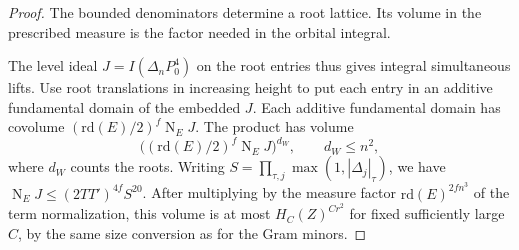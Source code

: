 \begin{proof}

The bounded denominators determine a root lattice. Its volume in the prescribed measure is the factor needed in the orbital integral.


The level ideal \(J=I(\Delta_nP_0^4)\) on the root
entries thus gives integral simultaneous lifts.
Use root translations in increasing height to put
each entry in an additive fundamental domain of
the embedded \(J\). Each additive fundamental domain has covolume
\((\mathrm{rd}(E)/2)^f\operatorname N_EJ\). The product has volume
\[
       \big((\mathrm{rd}(E)/2)^f\operatorname N_EJ\big)^{d_W},
       \qquad d_W\le n^2 ,
\]
where \(d_W\) counts the roots.
Writing \(S=\prod_{\tau,j}\max(1,|\Delta_j|_\tau)\),
we have \(\operatorname N_EJ\leq(2TT')^{4f}S^{20}\).
After multiplying by the measure factor
\(\mathrm{rd}(E)^{2fn^3}\) of the term normalization,
this volume is at most \(H_C(Z)^{Cr^2}\) for fixed
sufficiently large \(C\), by the same size conversion
as for the Gram minors.
\end{proof}
